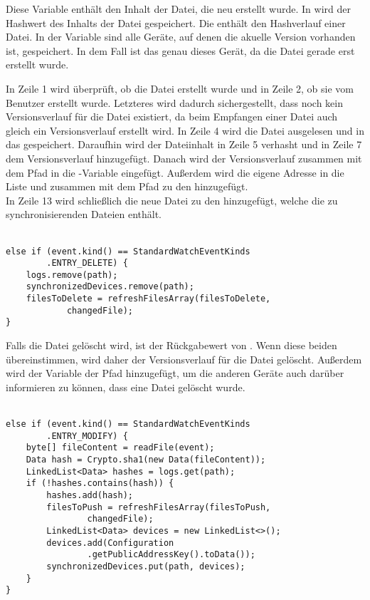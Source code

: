 \begin{description}
	Diese Variable enthält den Inhalt der Datei, die neu erstellt wurde.
	In  wird der Hashwert des Inhalts der Datei gespeichert.
	Die  enthält den Hashverlauf einer Datei. 
	In der Variable  sind alle Geräte, auf denen die akuelle Version vorhanden ist, gespeichert. In dem Fall ist das genau dieses Gerät, da die Datei gerade erst erstellt wurde.
\end{description}
In Zeile 1 wird überprüft, ob die Datei erstellt wurde und in Zeile 2, ob sie vom Benutzer erstellt wurde. Letzteres wird dadurch sichergestellt, dass noch kein Versionsverlauf für die Datei existiert, da beim Empfangen einer Datei auch gleich ein Versionsverlauf erstellt wird. In Zeile 4 wird die Datei ausgelesen und in das  gespeichert. Daraufhin wird der Dateiinhalt in Zeile 5 verhasht und in Zeile 7 dem Versionsverlauf hinzugefügt. Danach wird der Versionsverlauf zusammen mit dem Pfad in die -Variable eingefügt. Außerdem wird die eigene Adresse in die Liste  und zusammen mit dem Pfad zu den  hinzugefügt. \\
In Zeile 13 wird schließlich die neue Datei zu den  hinzugefügt, welche die zu synchronisierenden Dateien enthält. \\ \\
\javalisting
\begin{minipage}{\linewidth}
\begin{lstlisting}[caption={Löschen einer Datei},captionpos=b]
else if (event.kind() == StandardWatchEventKinds
		.ENTRY_DELETE) {
	logs.remove(path);
	synchronizedDevices.remove(path);
	filesToDelete = refreshFilesArray(filesToDelete,
			changedFile);
}
\end{lstlisting}
\end{minipage}
Falls die Datei gelöscht wird, ist der Rückgabewert von . Wenn diese beiden übereinstimmen, wird daher der Versionsverlauf für die Datei gelöscht. Außerdem wird der Variable  der Pfad hinzugefügt, um die anderen Geräte auch darüber informieren zu können, dass eine Datei gelöscht wurde. \\ \\
\javalisting
\begin{minipage}{\linewidth}
\begin{lstlisting}[caption={Bearbeiten einer Datei},captionpos=b]
else if (event.kind() == StandardWatchEventKinds
		.ENTRY_MODIFY) {
	byte[] fileContent = readFile(event);
	Data hash = Crypto.sha1(new Data(fileContent));
	LinkedList<Data> hashes = logs.get(path);
	if (!hashes.contains(hash)) {
		hashes.add(hash);
		filesToPush = refreshFilesArray(filesToPush,
				changedFile);
		LinkedList<Data> devices = new LinkedList<>();
		devices.add(Configuration
				.getPublicAddressKey().toData());
		synchronizedDevices.put(path, devices);
	}
}
\end{lstlisting}
\end{minipage}

